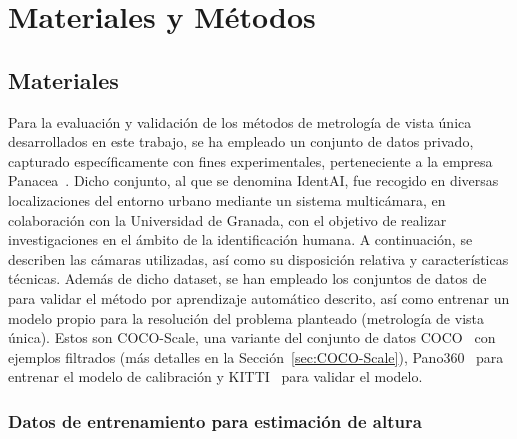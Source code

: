 \chapter{Materiales y Métodos}
\section{Materiales}
Para la evaluación y validación de los métodos de metrología de vista única desarrollados en este trabajo,
se ha empleado un conjunto de datos privado, capturado específicamente con fines experimentales, perteneciente a la empresa Panacea~\cite{panacea2026}.
Dicho conjunto, al que se denomina IdentAI, fue recogido en diversas localizaciones del entorno urbano mediante un sistema multicámara,
en colaboración con la Universidad de Granada, con el objetivo de realizar investigaciones en el ámbito de la identificación humana.
A continuación, se describen las cámaras utilizadas, así como su disposición relativa y características técnicas.
Además de dicho dataset, se han empleado los conjuntos de datos de~\cite{SVMIW} para validar el método
por aprendizaje automático descrito, así como entrenar un modelo propio para la resolución del problema planteado (metrología de vista única).
Estos son COCO-Scale, una variante del conjunto de datos COCO~\cite{COCO} con ejemplos filtrados (más detalles en la Sección~\ref{sec:COCO-Scale}),
Pano360~\cite{SPEC} para entrenar el modelo de calibración y KITTI~\cite{Kitti} para validar el modelo.

\label{sec:COCO-Scale}
\subsection{Datos de entrenamiento para estimación de altura}
